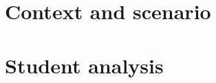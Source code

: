 \section{Context and scenario}\label{context-and-scenario}

\section{Student analysis}\label{student-analysis}
